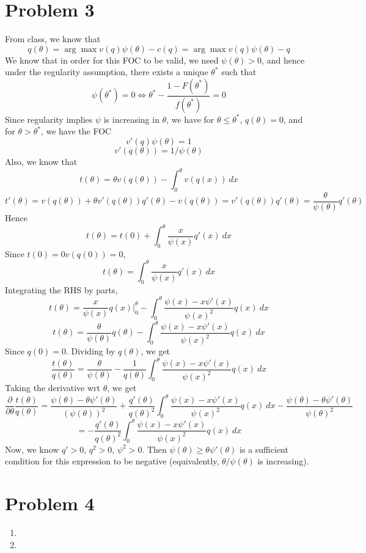 \documentclass[10pt,letter]{article}
\begin{document}
\section*{Problem 3}
From class, we know that
\[ q(\theta) = \arg\max v(q) \psi(\theta) - c(q)  = \arg\max v(q) \psi(\theta) - q \]
We know that in order for this FOC to be valid, we need $\psi(\theta) > 0$, and hence under the regularity assumption, there exists a unique $\theta^*$ such that
\[ \psi(\theta^*) = 0 \iff \theta^* - \frac{1-F(\theta^*)}{f(\theta^*)} = 0\]
Since regularity implies $\psi$ is increasing in $\theta$, we have for $\theta \le \theta^*$, $q(\theta) = 0$, and for $\theta > \theta^*$, we have the FOC
\[ v'(q) \psi(\theta) = 1 \]
\[ v'(q(\theta)) = 1/\psi(\theta) \]
Also, we know that
\[ t(\theta)= \theta v(q(\theta)) - \int_{0}^\theta v(q(x)) \ dx \]
\[ t'(\theta) = v(q(\theta)) + \theta v'(q(\theta))q'(\theta) - v(q(\theta)) = v'(q(\theta))q'(\theta) = \frac{\theta }{\psi(\theta)}q'(\theta) \]
Hence
\[ t(\theta) = t(0) + \int_0^{\theta} \frac{x}{\psi(x)}q'(x) \ dx \]
Since $t(0) = 0 v(q(0)) = 0$,
\[ t(\theta) = \int_0^{\theta} \frac{x}{\psi(x)}q'(x) \ dx \]
Integrating the RHS by parts,
\[ t(\theta) = \frac{x}{\psi(x)}q(x) \Bigr|_0^\theta - \int_0^\theta \frac{\psi(x) - x \psi'(x)}{\psi(x)^2 }q(x) \ dx \]
\[ t(\theta) = \frac{\theta}{\psi(\theta)}q(\theta) - \int_0^\theta \frac{\psi(x) - x \psi'(x)}{\psi(x)^2 }q(x) \ dx \]
Since $q(0) = 0$. Dividing by $q(\theta)$, we get
\[ \frac{t(\theta)}{q(\theta)} = \frac{\theta}{\psi(\theta)} - \frac{1}{q(\theta)}\int_0^\theta \frac{\psi(x) - x \psi'(x)}{\psi(x)^2 }q(x) \ dx \]
Taking the derivative wrt $\theta$, we get
\[ \frac{\partial}{\partial \theta}\frac{t(\theta)}{q(\theta)} = \frac{\psi(\theta) - \theta \psi'(\theta)}{(\psi(\theta))^2} + \frac{q'(\theta)}{q(\theta)^2}\int_0^\theta \frac{\psi(x) - x\psi'(x)}{\psi(x)^2 }q(x) \ dx - \frac{\psi(\theta) - \theta \psi'(\theta)}{\psi(\theta)^2 } \]
\[ = -\frac{q'(\theta)}{q(\theta)^2}\int_0^\theta \frac{\psi(x) - x\psi'(x)}{\psi(x)^2 }q(x) \ dx \]
Now, we know $q' > 0$, $q^2 > 0$, $\psi^2 > 0$. Then $\psi(\theta) \ge \theta \psi'(\theta) $ is a sufficient condition for this expression to be negative (equivalently, $\theta / \psi(\theta)$ is increasing).
\section*{Problem 4}
\begin{enumerate}[label=(\alph*)]
\item
\item
\end{enumerate}
\end{document}
